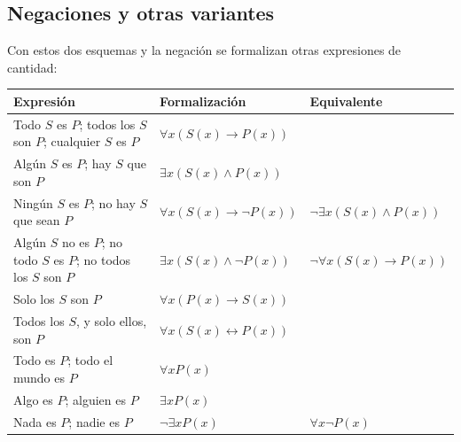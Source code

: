 \subsection{Negaciones y otras variantes}

Con estos dos esquemas y la negación se formalizan otras expresiones de cantidad:
\begin{center}
\renewcommand{\arraystretch}{1.3}
\begin{tabular}{|p{7.2cm}|l|l|}
\hline
\textbf{Expresión} & \textbf{Formalización} & \textbf{Equivalente} \\
\hline
Todo $S$ es $P$; todos los $S$ son $P$; cualquier $S$ es $P$ & $\forall x (S(x) \to P(x))$ & \\
Algún $S$ es $P$; hay $S$ que son $P$ & $\exists x (S(x) \land P(x))$ & \\
Ningún $S$ es $P$; no hay $S$ que sean $P$ & $\forall x (S(x) \to \neg P(x))$ & $\neg \exists x (S(x) \land P(x))$ \\
Algún $S$ no es $P$; no todo $S$ es $P$; no todos los $S$ son $P$ & $\exists x (S(x) \land \neg P(x))$ & $\neg \forall x (S(x) \to P(x))$ \\
Solo los $S$ son $P$ & $\forall x (P(x) \to S(x))$ & \\
Todos los $S$, y solo ellos, son $P$ & $\forall x (S(x) \leftrightarrow P(x))$ & \\
Todo es $P$; todo el mundo es $P$ & $\forall x P(x)$ & \\
Algo es $P$; alguien es $P$ & $\exists x P(x)$ & \\
Nada es $P$; nadie es $P$ & $\neg \exists x P(x)$ & $\forall x \neg P(x)$ \\
\hline
\end{tabular}
\end{center}

